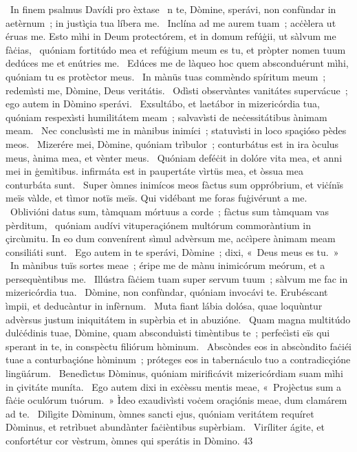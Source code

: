 {~In finem psalmus Davídi pro èxtase}
{%
~n te, Dòmine, sperávi, non confùndar in aetèrnum~; in justìçia tua líbera me.
~Inclína ad me aurem tuam~; acċèlera ut éruas me. Esto mìhi in Deum protectórem, et in domum refúġii, ut sàlvum me fàċias,
~quóniam fortitúdo mea et refúġium meum es tu, et pròpter nomen tuum dedúces me et enútries me.
~Edúces me de làqueo hoc quem absconduérunt mìhi, quóniam tu es protèctor meus.
~In mànüs tuas commèndo spíritum meum~; redemìsti me, Dòmine, Deus veritátis.
~Odìsti observàntes vanitátes supervácue~; ego autem in Dòmino sperávi.
~Exsultábo, et laetábor in mizericórdia tua, quóniam respexìsti humilitátem meam~; salvavìsti de neċessitátibus ànimam meam.
~Nec conclusìsti me in mànibus inimíci~; statuvìsti in loco spaçióso pèdes meos.
~Mizerére mei, Dòmine, quóniam trìbulor~; conturbátus est in ira òculus meus, ànima mea, et vènter meus.
~Quóniam deféċit in dolóre vita mea, et anni mei in ġemìtibus. infirmáta est in paupertáte vìrtüs mea, et òssua mea conturbáta sunt.
~Super òmnes inimícos meos fàctus sum oppróbrium, et viċínïs meïs vàlde, et tìmor notïs meïs. Qui vidébant me foras fuġivérunt a me.
~Oblivióni datus sum, tàmquam mórtuus a corde~; fàctus sum tàmquam vas pèrditum,
~quóniam audívi vituperaçiónem multórum commoràntium in çircùmitu. In eo dum convenírent sìmul advèrsum me, acċìpere ànimam meam consiliáti sunt.
~Ego autem in te sperávi, Dòmine~; dixi, «~Deus meus es tu.~»
~In mànibus tuïs sortes meae~; éripe me de mànu inimicórum meórum, et a persequèntibus me.
~Illústra fàċiem tuam super servum tuum~; sàlvum me fac in mizericórdia tua.
~Dòmine, non confùndar, quóniam invocávi te. Erubéscant ìmpii, et deducàntur in infèrnum.
~Muta fiant lábia dolósa, quae loquùntur advèrsus justum iniquitátem in supèrbia et in abuzióne.
~Quam magna multitúdo dulċédinis tuae, Dòmine, quam absconduìsti timèntibus te~; perfeċìsti eïs qui sperant in te, in conspèctu filiórum hòminum.
~Abscòndes eos in abscòndito faċiéi tuae a conturbaçióne hòminum~; próteges eos in tabernáculo tuo a contradicçióne lingüárum.
~Benedìctus Dòminus, quóniam mirificávit mizericórdiam suam mìhi in çivitáte muníta.
~Ego autem dixi in exċèssu mentis meae, «~Projèctus sum a fàċie oculórum tuórum.~» Ìdeo exaudivìsti voċem oraçiónis meae, dum clamárem ad te.
~Dilìgite Dòminum, òmnes sancti ejus, quóniam veritátem requíret Dòminus, et retrìbuet abundànter faċièntibus supèrbiam.
~Viríliter ágite, et confortétur cor vèstrum, òmnes qui sperátis in Dòmino.
}
{4}{3}
